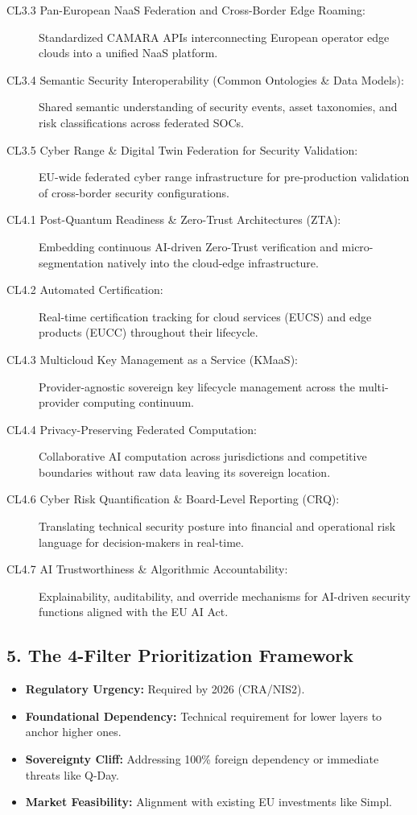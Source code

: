 \documentclass[12pt,a4paper]{report}
\begin{document}
\begin{description}
    \item[CL3.3 Pan-European NaaS Federation and Cross-Border Edge Roaming:] Standardized CAMARA APIs interconnecting European operator edge clouds into a unified NaaS platform.
    \item[CL3.4 Semantic Security Interoperability (Common Ontologies \& Data Models):] Shared semantic understanding of security events, asset taxonomies, and risk classifications across federated SOCs.
    \item[CL3.5 Cyber Range \& Digital Twin Federation for Security Validation:] EU-wide federated cyber range infrastructure for pre-production validation of cross-border security configurations.
    \item[CL4.1 Post-Quantum Readiness \& Zero-Trust Architectures (ZTA):] Embedding continuous AI-driven Zero-Trust verification and micro-segmentation natively into the cloud-edge infrastructure.
    \item[CL4.2 Automated Certification:] Real-time certification tracking for cloud services (EUCS) and edge products (EUCC) throughout their lifecycle.
    \item[CL4.3 Multicloud Key Management as a Service (KMaaS):] Provider-agnostic sovereign key lifecycle management across the multi-provider computing continuum.
    \item[CL4.4 Privacy-Preserving Federated Computation:] Collaborative AI computation across jurisdictions and competitive boundaries without raw data leaving its sovereign location.
    \item[CL4.6 Cyber Risk Quantification \& Board-Level Reporting (CRQ):] Translating technical security posture into financial and operational risk language for decision-makers in real-time.
    \item[CL4.7 AI Trustworthiness \& Algorithmic Accountability:] Explainability, auditability, and override mechanisms for AI-driven security functions aligned with the EU AI Act.
\end{description}

\subsection{5. The 4-Filter Prioritization Framework}
\begin{itemize}
    \item \textbf{Regulatory Urgency:} Required by 2026 (CRA/NIS2).
    \item \textbf{Foundational Dependency:} Technical requirement for lower layers to anchor higher ones.
    \item \textbf{Sovereignty Cliff:} Addressing 100\% foreign dependency or immediate threats like Q-Day.
    \item \textbf{Market Feasibility:} Alignment with existing EU investments like Simpl.
\end{itemize}
\end{document}
